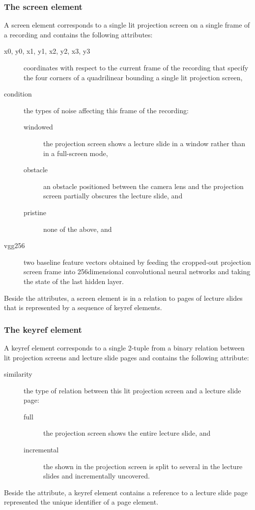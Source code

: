 \subsubsection*{The screen element}
A screen element corresponds to a single lit projection screen on a single
frame of a recording and contains the following attributes:
\begin{description}
  \item[x0\textmd, y0\textmd, x1\textmd, y1\textmd, x2\textmd, y2\textmd,
        x3\textmd, y3] coordinates with respect to the current frame
    of the recording that specify the four corners of a quadrilinear
    bounding a single lit projection screen,
  \item[condition] the types of noise affecting this frame of the recording:
    \begin{description}
      \item[windowed] the projection screen shows a lecture slide in a window
        rather than in a full-screen mode,
      \item[obstacle] an obstacle positioned between the camera lens and the
        projection screen partially obscures the lecture slide, and
      \item[pristine] none of the above, and
    \end{description}
  \item[vgg256] two baseline feature vectors obtained by feeding the
    cropped-out projection screen frame into 256dimensional 
    convolutional neural networks and taking the state of the last hidden
    layer.
\end{description}
Beside the attributes, a screen element is in a relation to pages of lecture
slides that is represented by a sequence of keyref elements.

\subsubsection*{The keyref element}
A keyref element corresponds to a single 2-tuple from a binary relation between
lit projection screens and lecture slide pages and contains the following
attribute:
\begin{description}
  \item[similarity] the type of relation between this lit projection screen and
    a lecture slide page:
    \begin{description}
      \item[full] the projection screen shows the entire lecture slide, and
      \item[incremental] the  shown in the projection screen
        is split to several  in the lecture slides and
        incrementally uncovered.
    \end{description}
\end{description}
Beside the attribute, a keyref element contains a reference to a lecture slide
page represented the unique identifier of a page element.

